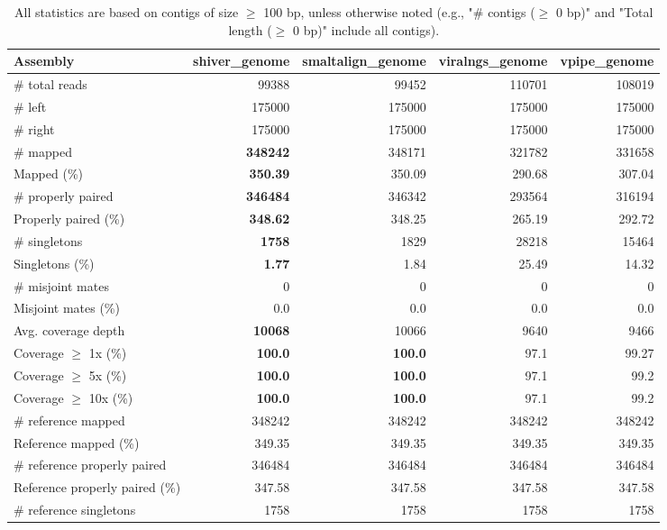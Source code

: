 \documentclass[12pt,a4paper]{article}
\begin{document}
\begin{table}[ht]
\begin{center}
\caption{All statistics are based on contigs of size $\geq$ 100 bp, unless otherwise noted (e.g., "\# contigs ($\geq$ 0 bp)" and "Total length ($\geq$ 0 bp)" include all contigs).}
\begin{tabular}{|l*{4}{|r}|}
\hline
Assembly & shiver\_genome & smaltalign\_genome & viralngs\_genome & vpipe\_genome \\ \hline
\# total reads & 99388 & 99452 & 110701 & 108019 \\ \hline
\# left & 175000 & 175000 & 175000 & 175000 \\ \hline
\# right & 175000 & 175000 & 175000 & 175000 \\ \hline
\# mapped & {\bf 348242} & 348171 & 321782 & 331658 \\ \hline
Mapped (\%) & {\bf 350.39} & 350.09 & 290.68 & 307.04 \\ \hline
\# properly paired & {\bf 346484} & 346342 & 293564 & 316194 \\ \hline
Properly paired (\%) & {\bf 348.62} & 348.25 & 265.19 & 292.72 \\ \hline
\# singletons & {\bf 1758} & 1829 & 28218 & 15464 \\ \hline
Singletons (\%) & {\bf 1.77} & 1.84 & 25.49 & 14.32 \\ \hline
\# misjoint mates & 0 & 0 & 0 & 0 \\ \hline
Misjoint mates (\%) & 0.0 & 0.0 & 0.0 & 0.0 \\ \hline
Avg. coverage depth & {\bf 10068} & 10066 & 9640 & 9466 \\ \hline
Coverage $\geq$ 1x (\%) & {\bf 100.0} & {\bf 100.0} & 97.1 & 99.27 \\ \hline
Coverage $\geq$ 5x (\%) & {\bf 100.0} & {\bf 100.0} & 97.1 & 99.2 \\ \hline
Coverage $\geq$ 10x (\%) & {\bf 100.0} & {\bf 100.0} & 97.1 & 99.2 \\ \hline
\# reference mapped & 348242 & 348242 & 348242 & 348242 \\ \hline
Reference mapped (\%) & 349.35 & 349.35 & 349.35 & 349.35 \\ \hline
\# reference properly paired & 346484 & 346484 & 346484 & 346484 \\ \hline
Reference properly paired (\%) & 347.58 & 347.58 & 347.58 & 347.58 \\ \hline
\# reference singletons & 1758 & 1758 & 1758 & 1758 \\ \hline

\end{tabular}
\end{center}
\end{table}
\end{document}
